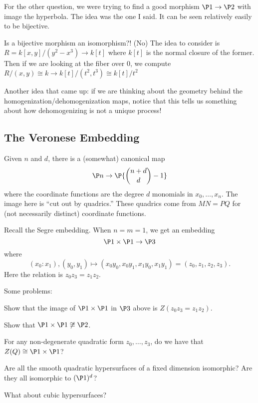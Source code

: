\documentclass[12pt]{article}
\begin{document}
For the other question, we were trying to find a good morphism $\P1\to\P2$ with image the hyperbola. The idea was the one I said. It can be seen relatively easily to be bijective.
\begin{rmk}
	Is a bijective morphism an isomorphism?! (No) The idea to consider is $R=k[x,y]/(y^2-x^3)\to k[t]$ where $k[t]$ is the normal closure of the former. Then if we are looking at the fiber over $0$, 
	we compute $R/(x,y)\cong k\to k[t]/(t^2,t^3)\cong k[t]/t^2$
\end{rmk}
\begin{rmk}
	Another idea that came up: if we are thinking about the geometry behind the homogenization/dehomogenization maps, notice that this tells us something about how 
	dehomogenizing is not a unique process!
\end{rmk}

\subsection{The Veronese Embedding}
Given $n$ and $d$, there is a (somewhat) canonical map 
\[\P n\to \P{\binom{n+d}{d}-1}\]
where the coordinate functions are the degree $d$ monomials in $x_0,\dots, x_n$. The image here is ``cut out by quadrics.'' These quadrics 
come from $MN=PQ$ for (not necessarily distinct) coordinate functions.

Recall the Segre embedding. When $n=m=1$, we get an embedding 
\[\P1\times \P1\to\P3\]
where 
\[(x_0:x_1),(y_0,y_1)\mapsto (x_0y_0,x_0y_1,x_1y_0,x_1y_1)=(z_0,z_1,z_2,z_3).\]
Here the relation is $z_0z_3=z_1z_2$.

Some problems:
\begin{prob}
	Show that the image of $\P1\times\P1$ in $\P3$ above is $Z(z_0z_3=z_1z_2)$.
\end{prob}
\begin{prob}
		Show that $\P1\times \P1\not\cong \P2$.
\end{prob}
\begin{prob}
	For any non-degenerate quadratic form $z_0,\dots,z_3$, do we have that $Z(Q)\cong \P1\times\P1$?
\end{prob}
\begin{prob}
	Are all the smooth quadratic hypersurfaces of a fixed dimension isomorphic? Are they all isomorphic to $(\P1)^d$?
\end{prob}
\begin{prob}
	What about cubic hypersurfaces?
\end{prob}
\end{document}
